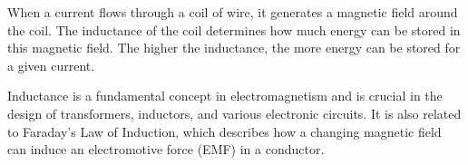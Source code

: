 When a current flows through a coil of wire, it generates a magnetic field around the coil. The inductance of the coil determines how much energy can be stored in this magnetic field. The higher the inductance, the more energy can be stored for a given current.

Inductance is a fundamental concept in electromagnetism and is crucial in the design of transformers, inductors, and various electronic circuits. It is also related to Faraday's Law of Induction, which describes how a changing magnetic field can induce an electromotive force (EMF) in a conductor.

